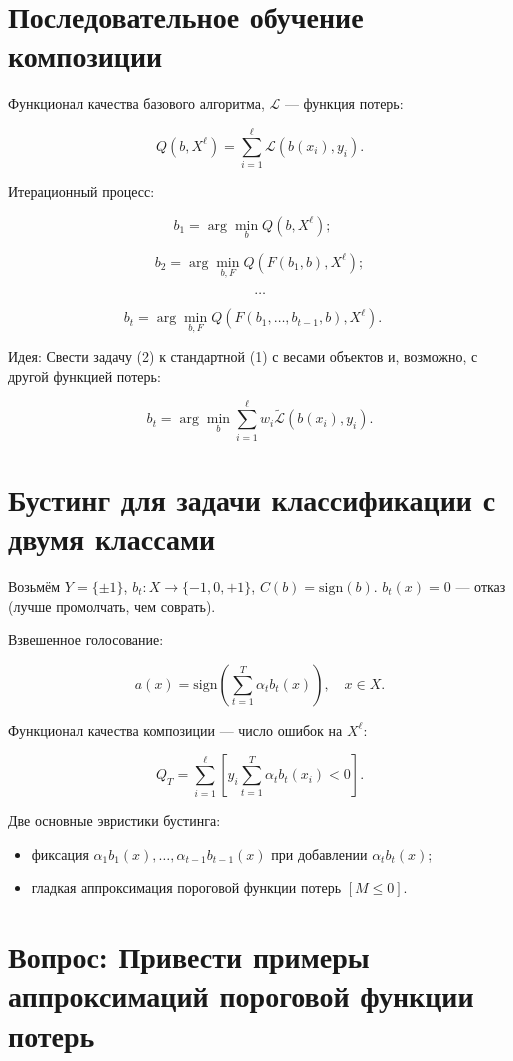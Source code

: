 \section*{Последовательное обучение композиции}

Функционал качества базового алгоритма, \(\mathcal{L}\) — функция потерь:

\[
Q(b, X^\ell) = \sum_{i=1}^\ell \mathcal{L}(b(x_i), y_i).
\]

Итерационный процесс:

\[
b_1 = \arg \min_{b} Q(b, X^\ell); \quad \tag{1}
\]

\[
b_2 = \arg \min_{b, F} Q(F(b_1, b), X^\ell);
\]

\[
\ldots
\]

\[
b_t = \arg \min_{b, F} Q(F(b_1, \ldots, b_{t-1}, b), X^\ell). \quad \tag{2}
\]

Идея: Свести задачу (2) к стандартной (1) с весами объектов и, возможно, с другой функцией потерь:

\[
b_t = \arg \min_{b} \sum_{i=1}^\ell w_i \tilde{\mathcal{L}}(b(x_i), y_i).
\]

\section*{Бустинг для задачи классификации с двумя классами}

Возьмём \( Y = \{\pm1\} \), \( b_t: X \rightarrow \{-1, 0, +1\} \), \( C(b) = \text{sign}(b) \).
\( b_t(x) = 0 \) — отказ (лучше промолчать, чем соврать).

Взвешенное голосование:

\[
a(x) = \text{sign}\left(\sum_{t=1}^T \alpha_t b_t(x)\right), \quad x \in X.
\]

Функционал качества композиции — число ошибок на \( X^\ell \):

\[
Q_T = \sum_{i=1}^\ell \left[ y_i \sum_{t=1}^T \alpha_t b_t(x_i) < 0 \right].
\]

Две основные эвристики бустинга:
\begin{itemize}
    \item фиксация \(\alpha_1 b_1(x), \ldots, \alpha_{t-1} b_{t-1}(x)\) при добавлении \(\alpha_t b_t(x)\);
    \item гладкая аппроксимация пороговой функции потерь \([M \leq 0]\).
\end{itemize}
\section*{Вопрос: Привести примеры аппроксимаций пороговой функции потерь}
